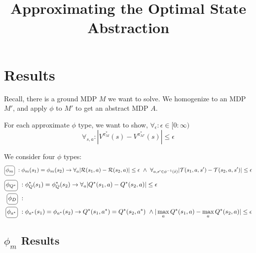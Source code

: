 \documentclass[11pt]{amsart}
\title{Approximating the Optimal State Abstraction}
\author{}
\date{}                                           %
\begin{document}
\maketitle


\section{Results}

Recall, there is a ground MDP $M$ we want to solve. We homogenize to an MDP $M'$, and apply $\phi$ to $M'$ to get an abstract MDP $A$.

For each approximate $\phi$ type, we want to show, $\forall_{\epsilon} : \epsilon \in [0 : \infty)$
\begin{equation}
\forall_{s,a} : | V^{\pi^*_M}(s) - V^{\pi^*_{M'}}(s) | \leq \epsilon
\end{equation}

We consider four $\phi$ types:
\begin{multline*}
\encircle{$\phi_m$}\ : \phi_{m}(s_1) = \phi_m(s_2) \rightarrow \forall_a |\mathcal{R}(s_1,a) - \mathcal{R}(s_2,a)| \leq \epsilon \ \wedge\ 
\forall_{a,s' \in \phi^{-1}(\bar{s})} | \mathcal{T}(s_1,a,s') - \mathcal{T}(s_2,a,s') | \leq \epsilon
\end{multline*}
\begin{align*}
\encircle{$\phi_{Q^*}$}\ & : \phi_Q^*(s_1) = \phi_Q^*(s_2) \rightarrow \forall_a |Q^*(s_1,a) - Q^*(s_2,a)| \leq \epsilon \\
\encircle{$\phi_{D}$}\ & : \\
\encircle{$\phi_{a^*}$}\ & : \phi_{a^*}(s_1) = \phi_{a^*}(s_2) \rightarrow Q^*(s_1,a^*) = Q^*(s_2, a^*)\ \wedge |\max_a Q^*(s_1,a) - \max_a Q^*(s_2,a)| \leq \epsilon  \\
\end{align*}


\subsection{$\phi_{m}$ Results}
\end{document}
